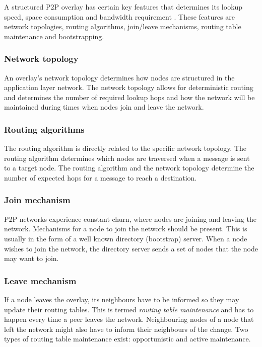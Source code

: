 A structured P2P overlay has certain key features that determines its lookup speed, space consumption and bandwidth requirement \cite{p2p_networking_handbook}. These features are network topologies, routing algorithms, join/leave mechanisms, routing table maintenance and bootstrapping.

\subsubsection{Network topology}

An overlay's network topology determines how nodes are structured in the application layer network. The network topology allows for deterministic routing and determines the number of required lookup hops and how the network will be maintained during times when nodes join and leave the network.

\subsubsection{Routing algorithms}

The routing algorithm is directly related to the specific network topology. The routing algorithm determines which nodes are traversed when a message is sent to a target node. The routing algorithm and the network topology determine the number of expected hops for a message to reach a destination.

\subsubsection{Join mechanism}

P2P networks experience constant churn, where nodes are joining and leaving the network. Mechanisms for a node to join the network should be present. This is usually in the form of a well known directory (bootstrap) server. When a node wishes to join the network, the directory server sends a set of nodes that the node may want to join.

\subsubsection{Leave mechanism}

If a node leaves the overlay, its neighbours have to be informed so they may update their routing tables. This is termed \emph{routing table maintenance} and has to happen every time a peer leaves the network. Neighbouring nodes of a node that left the network might also have to inform their neighbours of the change. Two types of routing table maintenance exist: opportunistic and active maintenance.

